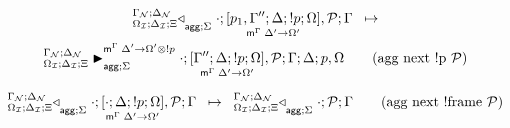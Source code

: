 
\begin{multline}
\transx{
   \contstatea{\deltan}{\cdot ; \pframe{p_1, \Gamma''}{\Delta}{\bang
   p}{\Omega}{\Delta'}{\Omega'}, \lstack{P}}{\Gamma}{\Sigma}
}
{
   \matstatea{\deltan}{\cdot; \pframe{\Gamma''}{\Delta}{\bang p}
      {\Omega}{\Delta'}{\Omega'}, \lstack{P}}{\Gamma}{\Delta}{p,
      \Omega}{\Delta' \rightarrow \Omega' \otimes \bang p}{\Sigma}
} \tag{agg next \bang p $\lstack{P}$}
\end{multline}

\[
\trans{
   \contstatea{\deltan}{\cdot; \pframe{\cdot}{\Delta}{\bang
   p}{\Omega}{\Delta'}{\Omega'}, \lstack{P}}{\Gamma}{\Sigma}
}
{
   \contstatea{\deltan}{\cdot ; \lstack{P}}{\Gamma}{\Sigma}
} \tag{agg next \bang frame $\lstack{P}$}
\]
